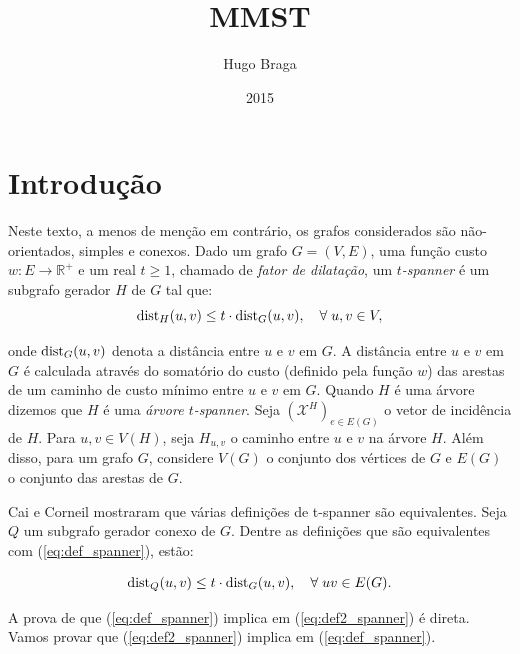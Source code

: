 \documentclass[11pt,reqno]{amsart}
\title{MMST}
\author{Hugo Braga}
\date{2015}
\newcommand{\dist}{{\rm dist}}
\newcommand{\incid}{\mathcal{X}}
\begin{document}
\maketitle

\section{Introdução}
Neste texto, a menos de menção em contrário, os grafos considerados
são não-orientados, simples e conexos.  Dado um grafo $G=(V,E)$, 
uma função custo $w: E \to \mathbb{R}^+$ e um
real $t \ge 1$, chamado de \emph{fator de dilatação}, um
\emph{$t$-spanner} é um subgrafo gerador $H$ de $G$ tal que:
\begin{equation}
\dist_{H}(u,v) \le t \cdot \dist_{G}(u,v), \quad \forall\;u,v \in V, 
\label{eq:def_spanner}
\end{equation}

\noindent onde $\dist_{G}(u,v)$ denota a distância entre $u$ e $v$ em
$G$. A distância entre $u$ e $v$ em $G$ é calculada através do 
somatório do custo (definido pela 
função $w$) das arestas de um caminho de custo mínimo entre $u$ e $v$ em $G$. 
Quando $H$ é uma árvore dizemos que $H$ é uma \emph{árvore $t$-spanner}. 
Seja $(\incid^{H})_{e \in E(G)}$ o vetor de incidência de $H$.
Para $u,v \in V(H)$, seja $H_{u,v}$ o caminho entre $u$ e $v$ na árvore  $H$.
Além disso, para um grafo $G$, considere $V(G)$ o conjunto 
dos vértices de $G$ e $E(G)$ o conjunto das arestas de $G$.

Cai e Corneil \cite{CaiC1995} 
mostraram que várias definições de t-spanner são equivalentes. 
Seja $Q$ um subgrafo gerador conexo de $G$.
Dentre as definições que são equivalentes com (\ref{eq:def_spanner}), estão:

\begin{equation}
\dist_{Q}(u,v) \le t \cdot \dist_{G}(u,v), \quad \forall\;uv \in E(G).
\label{eq:def2_spanner}
\end{equation}

A prova de que (\ref{eq:def_spanner}) implica em (\ref{eq:def2_spanner}) 
é direta. 
Vamos provar que (\ref{eq:def2_spanner}) implica em (\ref{eq:def_spanner}). 
\end{document}
